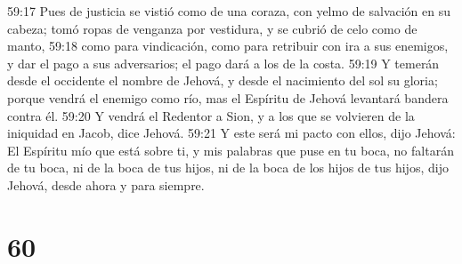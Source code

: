 59:17 Pues de justicia se vistió como de una coraza, con yelmo de salvación en su cabeza; tomó ropas de venganza por vestidura, y se cubrió de celo como de manto,  
59:18 como para vindicación, como para retribuir con ira a sus enemigos, y dar el pago a sus adversarios; el pago dará a los de la costa.  
59:19 Y temerán desde el occidente el nombre de Jehová, y desde el nacimiento del sol su gloria; porque vendrá el enemigo como río, mas el Espíritu de Jehová levantará bandera contra él.  
59:20 Y vendrá el Redentor a Sion, y a los que se volvieren de la iniquidad en Jacob, dice Jehová.  
59:21 Y este será mi pacto con ellos, dijo Jehová: El Espíritu mío que está sobre ti, y mis palabras que puse en tu boca, no faltarán de tu boca, ni de la boca de tus hijos, ni de la boca de los hijos de tus hijos, dijo Jehová, desde ahora y para siempre.  

\chapter{60}

